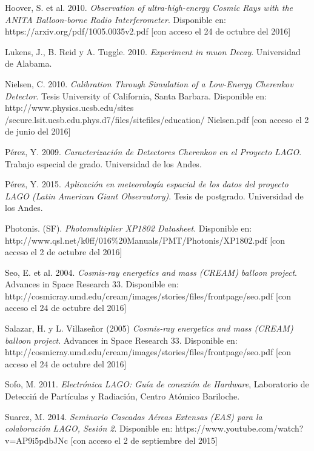 \documentclass{book}
\begin{document}
\begin{thebibliography}{9}
 Hoover, S. et al. 2010. \textit{Observation of ultra-high-energy Cosmic Rays with the ANITA Balloon-borne Radio Interferometer}. Disponible en: https://arxiv.org/pdf/1005.0035v2.pdf [con acceso el 24 de octubre del 2016]

 Lukens, J., B. Reid y A. Tuggle.  2010. \textit{Experiment in muon Decay}. Universidad de Alabama.

 Nielsen, C.  2010. \textit{Calibration Through Simulation of a Low-Energy Cherenkov Detector}. Tesis University of California, Santa Barbara. Disponible en: http://www.physics.ucsb.edu/sites\\/secure.lsit.ucsb.edu.phys.d7/files/sitefiles/education/ Nielsen.pdf [con acceso el 2 de junio del 2016]

 P\'erez, Y. 2009. \textit{Caracterizaci\'on de Detectores Cherenkov en el Proyecto LAGO}. Trabajo especial de grado. Universidad de los Andes.

 P\'erez, Y. 2015. \textit{Aplicaci\'on en meteorolog\'ia espacial de los datos del proyecto LAGO (Latin American Giant Observatory)}. Tesis de postgrado. Universidad de los Andes.

 Photonis. (SF). \textit{Photomultiplier XP1802 Datasheet}. Disponible en: http://www.qsl.net/k0ff/016\%20Manuals/PMT/Photonis/XP1802.pdf [con acceso el 2 de octubre del 2016]

 Seo, E. et al. 2004. \textit{Cosmis-ray energetics and mass (CREAM) balloon project}. Advances in Space Research 33. Disponible en: http://cosmicray.umd.edu/cream/images/stories/files/frontpage/seo.pdf [con acceso el 24 de octubre del 2016]

 Salazar, H. y L. Villase\~nor (2005) \textit{Cosmis-ray energetics and mass (CREAM) balloon project}. Advances in Space Research 33. Disponible en: http://cosmicray.umd.edu/cream/images/stories/files/frontpage/seo.pdf [con acceso el 24 de octubre del 2016]

 Sofo, M. 2011. \textit{Electr\'onica LAGO: Gu\'ia de conexi\'on de Hardware}, Laboratorio de Detecci\'n de Part\'iculas y Radiaci\'on, Centro At\'omico Bariloche.

 Suarez, M. 2014. \textit{Seminario Cascadas A\'ereas Extensas (EAS) para la colaboraci\'on LAGO, Sesi\'on 2}. Disponible en: https://www.youtube.com/watch?v=AP9i5pdbJNc [con acceso el 2 de septiembre del 2015]


\end{thebibliography}
\end{document}

